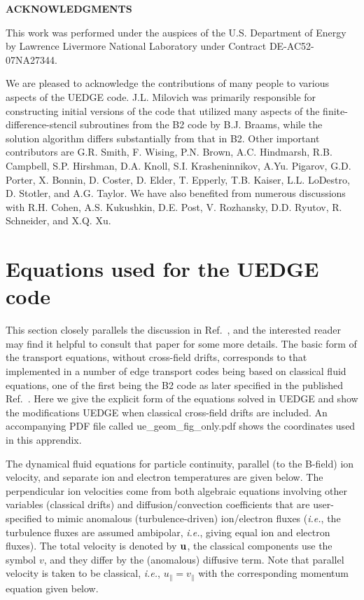 \documentclass [12pt]{article}
\begin{document}
\noindent
{\bf ACKNOWLEDGMENTS} 

This work was performed under the auspices of the U.S. Department of Energy by Lawrence
Livermore National Laboratory under Contract DE-AC52-07NA27344.

We are pleased to acknowledge the contributions of many people to various
aspects of the {\sf UEDGE} code. J.L. Milovich was primarily responsible for
constructing initial versions of the code that utilized many aspects of the
finite-difference-stencil subroutines from the B2 code by B.J. Braams,
while the solution algorithm differs substantially from that in B2.  Other
important contributors are G.R. Smith, F. Wising, P.N. Brown, A.C. Hindmarsh,
R.B. Campbell, S.P. Hirshman, D.A. Knoll, S.I. Krasheninnikov, A.Yu. Pigarov,
G.D. Porter, X. Bonnin, D. Coster, D. Elder, T. Epperly, T.B. Kaiser,
L.L. LoDestro, D. Stotler, and A.G. Taylor.  We have also
benefited from numerous discussions with R.H. Cohen, A.S. Kukushkin,
D.E. Post, V. Rozhansky, D.D. Ryutov, R. Schneider, and X.Q. Xu.

\appendix
\section{Equations used for the {\sf UEDGE} code} 


This section closely parallels the discussion in Ref.~, and the
interested reader may find it helpful to consult that paper for some more
details.  The basic form of the transport equations, without cross-field
drifts, corresponds to that implemented in a number of edge transport codes
being based on classical fluid equations, one of the first being the B2
\cite{braams87} code as later specified in the published
Ref.~. Here we give the explicit form of the equations
solved in {\sf UEDGE} and show the modifications {\sf UEDGE} when classical 
cross-field drifts are included. An accompanying PDF file called 
{\sf ue\_geom\_fig\_only.pdf} shows the coordinates used in this apprendix.

The dynamical fluid equations for particle continuity, parallel (to the
B-field) ion velocity, and separate ion and electron temperatures are given
below.  The perpendicular ion velocities come from both algebraic equations
involving other variables (classical drifts) and diffusion/convection
coefficients that are user-specified to mimic anomalous (turbulence-driven)
ion/electron fluxes ({\it i.e.}, the turbulence fluxes are assumed ambipolar,
{\it i.e.}, giving equal ion and electron fluxes). The total velocity is
denoted by ${\bf u}$, the classical components use the symbol $v$, and they
differ by the (anomalous) diffusive term.  Note that parallel velocity is
taken to be classical, {\it i.e.}, $u_\| =v_\|$ with the corresponding
momentum equation given below.
\end{document}
